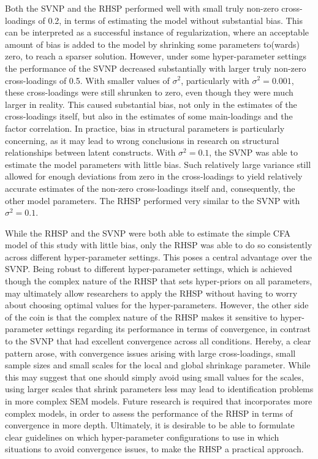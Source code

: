 \documentclass[
  man, donotrepeattitle,floatsintext]{apa6}
\begin{document}
Both the SVNP and the RHSP performed well with small truly non-zero cross-loadings of 0.2, in terms of estimating the model without substantial bias. This can be interpreted as a successful instance of regularization, where an acceptable amount of bias is added to the model by shrinking some parameters to(wards) zero, to reach a sparser solution. However, under some hyper-parameter settings the performance of the SVNP decreased substantially with larger truly non-zero cross-loadings of 0.5. With smaller values of \(\sigma^2\), particularly with \(\sigma^2 = 0.001\), these cross-loadings were still shrunken to zero, even though they were much larger in reality. This caused substantial bias, not only in the estimates of the cross-loadings itself, but also in the estimates of some main-loadings and the factor correlation. In practice, bias in structural parameters is particularly concerning, as it may lead to wrong conclusions in research on structural relationships between latent constructs. With \(\sigma^2 = 0.1\), the SVNP was able to estimate the model parameters with little bias. Such relatively large variance still allowed for enough deviations from zero in the cross-loadings to yield relatively accurate estimates of the non-zero cross-loadings itself and, consequently, the other model parameters. The RHSP performed very similar to the SVNP with \(\sigma^2 = 0.1\).

While the RHSP and the SVNP were both able to estimate the simple CFA model of this study with little bias, only the RHSP was able to do so consistently across different hyper-parameter settings. This poses a central advantage over the SVNP. Being robust to different hyper-parameter settings, which is achieved though the complex nature of the RHSP that sets hyper-priors on all parameters, may ultimately allow researchers to apply the RHSP without having to worry about choosing optimal values for the hyper-parameters. However, the other side of the coin is that the complex nature of the RHSP makes it sensitive to hyper-parameter settings regarding its performance in terms of convergence, in contrast to the SVNP that had excellent convergence across all conditions. Hereby, a clear pattern arose, with convergence issues arising with large cross-loadings, small sample sizes and small scales for the local and global shrinkage parameter. While this may suggest that one should simply avoid using small values for the scales, using larger scales that shrink parameters less may lead to identification problems in more complex SEM models. Future research is required that incorporates more complex models, in order to assess the performance of the RHSP in terms of convergence in more depth. Ultimately, it is desirable to be able to formulate clear guidelines on which hyper-parameter configurations to use in which situations to avoid convergence issues, to make the RHSP a practical approach.
\end{document}
